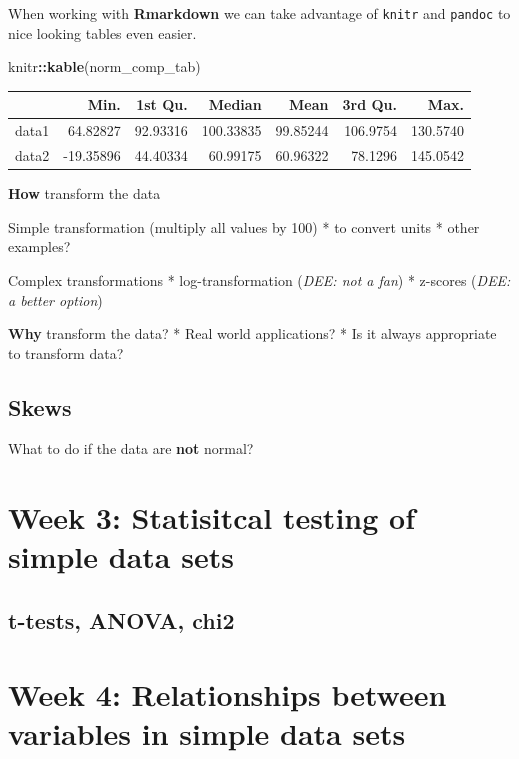 \documentclass[
]{book}
\newenvironment{Shaded}{\begin{snugshade}}{\end{snugshade}}
\newcommand{\KeywordTok}[1]{\textcolor[rgb]{0.13,0.29,0.53}{\textbf{#1}}}
\newcommand{\NormalTok}[1]{#1}
\newcommand{\OperatorTok}[1]{\textcolor[rgb]{0.81,0.36,0.00}{\textbf{#1}}}
\begin{document}
When working with \textbf{Rmarkdown} we can take advantage of \texttt{knitr} and \texttt{pandoc} to nice looking tables even easier.

\begin{Shaded}
\begin{Highlighting}[]
\NormalTok{knitr}\OperatorTok{::}\KeywordTok{kable}\NormalTok{(norm_comp_tab)}
\end{Highlighting}
\end{Shaded}

\begin{tabular}{l|r|r|r|r|r|r}
\hline
  & Min. & 1st Qu. & Median & Mean & 3rd Qu. & Max.\\
\hline
data1 & 64.82827 & 92.93316 & 100.33835 & 99.85244 & 106.9754 & 130.5740\\
\hline
data2 & -19.35896 & 44.40334 & 60.99175 & 60.96322 & 78.1296 & 145.0542\\
\hline
\end{tabular}

\textbf{How} transform the data

Simple transformation (multiply all values by 100)
* to convert units
* other examples?

Complex transformations
* log-transformation (\emph{DEE: not a fan})
* z-scores (\emph{DEE: a better option})

\textbf{Why} transform the data?
* Real world applications?
* Is it always appropriate to transform data?

\hypertarget{skews}{%
\subsection{Skews}\label{skews}}

What to do if the data are \textbf{not} normal?

\hypertarget{week-3-statisitcal-testing-of-simple-data-sets-1}{%
\section{Week 3: Statisitcal testing of simple data sets}\label{week-3-statisitcal-testing-of-simple-data-sets-1}}

\hypertarget{t-tests-anova-chi2}{%
\subsection{t-tests, ANOVA, chi2}\label{t-tests-anova-chi2}}

\hypertarget{week-4-relationships-between-variables-in-simple-data-sets}{%
\section{Week 4: Relationships between variables in simple data sets}\label{week-4-relationships-between-variables-in-simple-data-sets}}
\end{document}
